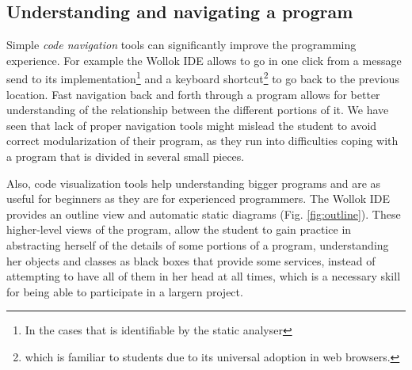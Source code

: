 %
%

\subsection{Understanding and navigating a program}
Simple \emph{code navigation} tools can significantly improve the programming experience.
For example the Wollok IDE allows to go in one click from a message send to its implementation\footnote{In the cases that is identifiable by the static analyser} and a keyboard shortcut\footnote{ which is familiar to students due to its universal adoption in web browsers.} to go back to the previous location.
Fast navigation back and forth through a program allows for better understanding of the relationship between the different portions of it.
We have seen that lack of proper navigation tools might mislead the student to avoid correct modularization of their program, as they run into difficulties coping with a program that is divided in several small pieces.

Also, code visualization tools help understanding bigger programs and are as useful for beginners as they are for experienced programmers.
The Wollok IDE provides an outline view and automatic static diagrams (\cf Fig. \ref{fig:outline}).
These higher-level views of the program, allow the student to gain practice in abstracting herself of the details of some portions of a program, understanding her objects and classes as black boxes that provide some services, instead of attempting to have all of them in her head at all times, which is a necessary skill for being able to participate in a largern project.

